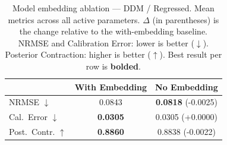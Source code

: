 \begin{table}[t]
\centering
\caption{Model embedding ablation — DDM / Regressed. Mean metrics across
all active parameters. $\Delta$ (in parentheses) is the change relative to the
with-embedding baseline. NRMSE and Calibration Error: lower is better ($\downarrow$).
Posterior Contraction: higher is better ($\uparrow$). Best result per row is
\textbf{bolded}.}
\label{tab:embed_ablation_ddm_regressed}
\begin{tabular}{lcc}
\toprule
 & With Embedding & No Embedding \\
\midrule
NRMSE $\downarrow$ & 0.0843 & \textbf{0.0818} \small{(-0.0025)} \\
Cal.\ Error $\downarrow$ & \textbf{0.0305} & 0.0305 \small{(+0.0000)} \\
Post.\ Contr. $\uparrow$ & \textbf{0.8860} & 0.8838 \small{(-0.0022)} \\
\bottomrule
\end{tabular}
\end{table}